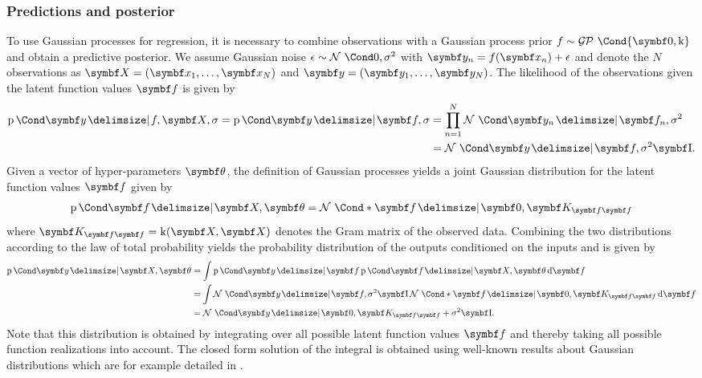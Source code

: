 \subsubsection{Predictions and posterior}
To use Gaussian processes for regression, it is necessary to combine observations with a Gaussian process prior $f \sim \GP\Cond{\mat{0}, \K}$ and obtain a predictive posterior.
We assume Gaussian noise $\epsilon \sim \Gaussian{0, \sigma^2}$ with $\mat{y}_n = f(\mat{x}_n) + \epsilon$ and denote the $N$ observations as $\mat{X} = (\mat{x}_1, \dots, \mat{x}_N)$ and $\mat{y} = (\mat{y}_1, \dots, \mat{y}_N)$.
The likelihood of the observations given the latent function values $\mat{f}$ is given by
\begin{align}
    \begin{split}
        \Prob{\mat{y} \given f, \mat{X}, \sigma}
        = \Prob{\mat{y} \given \mat{f}, \sigma}
        &= \prod_{n = 1}^N \Gaussian{\mat{y}_n \given \mat{f}_n, \sigma^2} \\
        &= \Gaussian{\mat{y} \given \mat{f}, \sigma^2 \Eye}.
    \end{split}
\end{align}
Given a vector of hyper-parameters $\mat{\theta}$, the definition of Gaussian processes yields a joint Gaussian distribution for the latent function values $\mat{f}$ given by
\begin{align}
    \Prob{\mat{f} \given \mat{X}, \mat{\theta}} = \Gaussian*{\mat{f} \given \mat{0}, \mat{K}_{\mat{f}\mat{f}}}
\end{align}
where $\mat{K}_{\mat{f}\mat{f}} = \K(\mat{X}, \mat{X})$ denotes the Gram matrix of the observed data.
Combining the two distributions according to the law of total probability yields the probability distribution of the outputs conditioned on the inputs and is given by
\begin{align}
    \begin{split}
        \label{eq:gp:gp_marginal_likelihood}
        \Prob{\mat{y} \given \mat{X}, \mat{\theta}} &= \int \Prob{\mat{y} \given \mat{f}} \Prob{\mat{f} \given \mat{X}, \mat{\theta}} \diff \mat{f} \\
        &= \int \Gaussian{\mat{y} \given \mat{f}, \sigma^2 \Eye} \Gaussian*{\mat{f} \given \mat{0}, \mat{K}_{\mat{f}\mat{f}}} \diff \mat{f} \\
        &= \Gaussian{\mat{y} \given \mat{0}, \mat{K}_{\mat{f}\mat{f}} + \sigma^2 \Eye}.
    \end{split}
\end{align}
Note that this distribution is obtained by integrating over all possible latent function values $\mat{f}$ and thereby taking all possible function realizations into account.
The closed form solution of the integral is obtained using well-known results about Gaussian distributions which are for example detailed in \cite{petersen_matrix_2008}.


